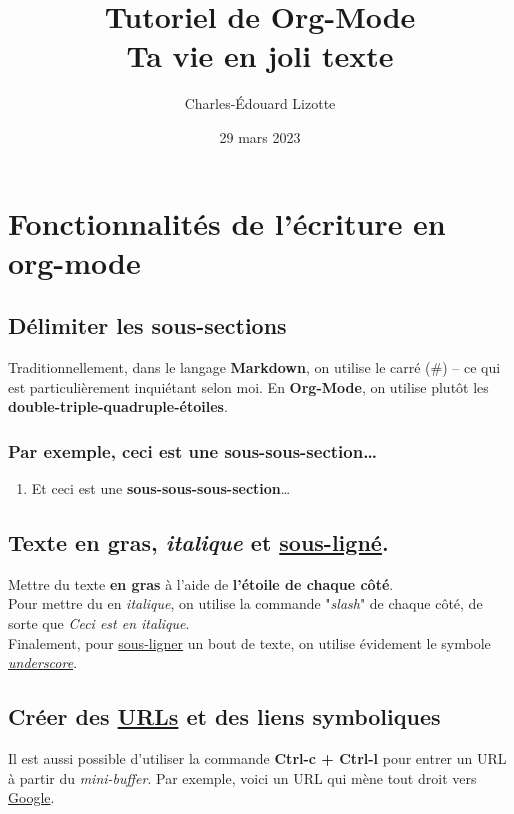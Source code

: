 \documentclass{article}
\author{Charles-Édouard Lizotte}
\date{29 mars 2023}
\title{Tutoriel de Org-Mode\\\medskip
\large Ta vie en joli texte}
\numberwithin{equation}{section}
\begin{document}
\maketitle
\tableofcontents


\section{Fonctionnalités de l'écriture en org-mode}
\label{sec:org784ec7a}
\subsection{Délimiter les sous-sections}
\label{sec:orgf815e23}
Traditionnellement, dans le langage \textbf{Markdown}, on utilise le carré (\#) -- ce qui est particulièrement inquiétant selon moi.
En \textbf{Org-Mode}, on utilise plutôt les \textbf{double-triple-quadruple-étoiles}.
\subsubsection{Par exemple, ceci est une \textbf{sous-sous-section}\ldots{}}
\label{sec:org8ee5ccb}
\begin{enumerate}
\item Et ceci est une \textbf{sous-sous-sous-section}\ldots{}
\label{sec:org948b81b}
\end{enumerate}

\subsection{Texte en \textbf{gras}, \emph{italique} et \underline{sous-ligné}.}
\label{sec:orge8a9201}
Mettre du texte \textbf{en gras} à l'aide de \textbf{l'étoile de chaque côté}.\\[0pt]

Pour mettre du  en \emph{italique}, on utilise la commande "\emph{slash}" de chaque côté, de sorte que \emph{Ceci est en italique}.\\[0pt]

Finalement, pour \uline{sous-ligner} un bout de texte, on utilise évidement le symbole \emph{\uline{underscore}}.

\subsection{Créer des \href{https://www.youtube.com/watch?v=DLzxrzFCyOs\&t=1s}{URLs} et des liens symboliques}
\label{sec:orgf139374}
Il est aussi possible d'utiliser la commande \textbf{Ctrl-c + Ctrl-l} pour entrer un URL à partir du \emph{mini-buffer}. 
Par exemple, voici un URL qui mène tout droit vers \href{https://www.google.ca/}{Google}. \\[0pt]
\end{document}
